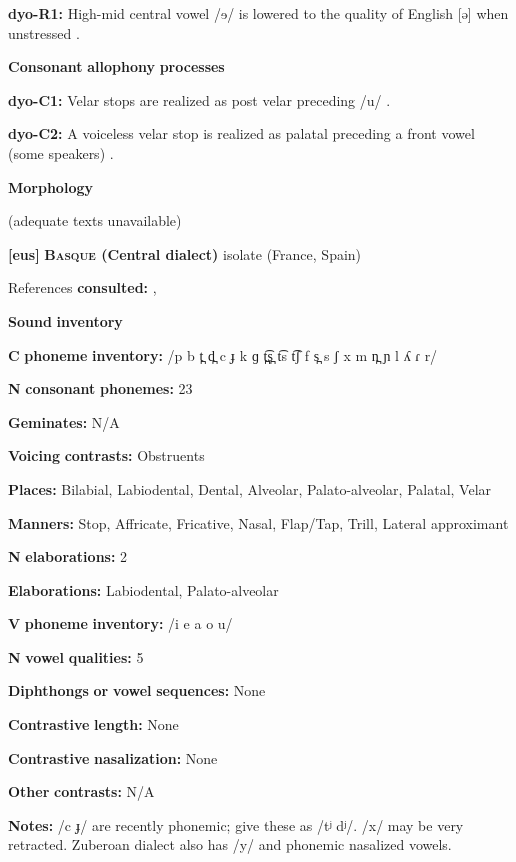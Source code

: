 \begin{styleBody}
\textbf{dyo-R1:} High-mid central vowel /ɘ/ is lowered to the quality of English [ə] when unstressed \citep[6]{Sapir1965}.

\textbf{Consonant} \textbf{allophony} \textbf{processes}

\textbf{dyo-C1:} Velar stops are realized as post velar preceding /u/ \citep[5]{Sapir1965}.

\textbf{dyo-C2:} A voiceless velar stop is realized as palatal preceding a front vowel (some speakers) \citep{Sapir1965}.

\textbf{Morphology}

(adequate texts unavailable)

\textbf{[eus]}   \textbf{\textsc{Basque} \textbf{(Central} \textbf{dialect)}}  isolate (France, Spain)

References \textbf{consulted:} \citet{Hualde2003}, \citet{SaltarelliEtAl1988}

\textbf{Sound} \textbf{inventory}

\textbf{C} \textbf{phoneme} \textbf{inventory:} /p b t̪ d̪ c ɟ k ɡ t̪͡s̪ t͡s t͡ʃ f s̪ s ʃ x m n̪ ɲ l ʎ ɾ r/

\textbf{N} \textbf{consonant} \textbf{phonemes:} 23

\textbf{Geminates:} N/A

\textbf{Voicing} \textbf{contrasts:} Obstruents

\textbf{Places:} Bilabial, Labiodental, Dental, Alveolar, Palato-alveolar, Palatal, Velar

\textbf{Manners:} Stop, Affricate, Fricative, Nasal, Flap/Tap, Trill, Lateral approximant

\textbf{N} \textbf{elaborations:} 2

\textbf{Elaborations:} Labiodental, Palato-alveolar

\textbf{V} \textbf{phoneme} \textbf{inventory:} /i e a o u/

\textbf{N} \textbf{vowel} \textbf{qualities:} 5

\textbf{Diphthongs} \textbf{or} \textbf{vowel} \textbf{sequences:} None

\textbf{Contrastive} \textbf{length:} None

\textbf{Contrastive} \textbf{nasalization:} None

\textbf{Other} \textbf{contrasts:} N/A

\textbf{Notes:} /c ɟ/ are recently phonemic; \citet{SaltarelliEtAl1988} give these as /tʲ dʲ/. /x/ may be very retracted. Zuberoan dialect also has /y/ and phonemic nasalized vowels.


\end{styleBody}
